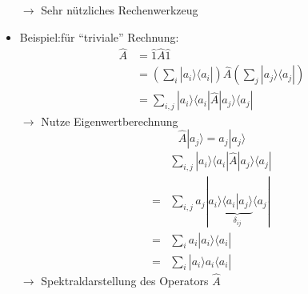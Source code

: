 \documentclass[10pt,article,colorback,accentcolor=tud9d]{scrartcl}
\begin{document}
\begin{itemize}
\begin{equation}
    \end{equation}
    $\rightarrow$ Sehr nützliches Rechenwerkzeug
  \item Beispiel:für "`triviale"' Rechnung:
    \begin{equation}
    \begin{aligned}
    \hat{A} &= \hat{1}\hat{A}\hat{1}\\
    &=\left(\sum_i\left.\right|a_i\rangle \langle a_i\left.\right|\right)\hat{A}\left(\sum_j\left.\right|a_j\rangle \langle a_j\left.\right|\right)\\
    &=\sum_{i,j}\left.\right|a_i\rangle \langle a_i\left.\right|\hat{A}\left.\right|a_j\rangle \langle a_j\left.\right|
    \end{aligned}
    \end{equation}
    $\rightarrow$ Nutze Eigenwertberechnung
    \begin{equation}
    \hat{A}\left.\right|a_j\rangle =a_j\left.\right|a_j\rangle  \nonumber
    \end{equation}
    \begin{equation}
    \begin{aligned}
    &\sum_{i,j}\left.\right|a_i\rangle \langle a_i\left.\right|\hat{A}\left.\right|a_j\rangle \langle a_j\left.\right|\\
    =&\sum_{i,j}a_j\left.\right|a_i\rangle \underbrace{\langle a_i\left.\right|a_j\rangle }_{\delta_{ij}}\langle a_j\left.\right|\\
    =&\sum_ia_i\left.\right|a_i\rangle \langle a_i\left.\right|\\
    =&\sum_i\left.\right|a_i\rangle a_i\langle a_i\left.\right|
    \end{aligned}
    \end{equation}
    $\rightarrow$ Spektraldarstellung des Operators $\hat{A}$
  
\end{itemize}
\end{document}
